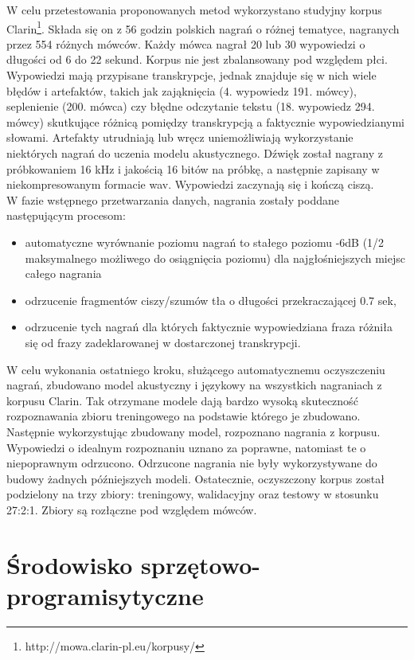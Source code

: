 \documentclass[shortabstract, mgr]{iithesis}
\begin{document}
	W celu przetestowania proponowanych metod wykorzystano studyjny korpus Clarin\footnote{http://mowa.clarin-pl.eu/korpusy/}. Składa się on z 56 godzin polskich nagrań o różnej tematyce, nagranych przez 554 różnych mówców. Każdy mówca nagrał 20 lub 30 wypowiedzi o długości od 6 do 22 sekund. Korpus nie jest zbalansowany pod względem płci. Wypowiedzi mają przypisane transkrypcje, jednak znajduje się w nich wiele błędów i artefaktów, takich jak zająknięcia (4. wypowiedz 191. mówcy), seplenienie (200. mówca) czy błędne odczytanie tekstu (18. wypowiedz 294. mówcy) skutkujące różnicą pomiędzy transkrypcją a faktycznie wypowiedzianymi słowami. Artefakty utrudniają lub wręcz uniemożliwiają wykorzystanie niektórych nagrań do uczenia modelu akustycznego. Dźwięk został nagrany z próbkowaniem 16 kHz i jakością 16 bitów na próbkę, a następnie zapisany w niekompresowanym formacie wav. Wypowiedzi zaczynają się i kończą ciszą. 
	\\
	W fazie wstępnego przetwarzania danych, nagrania zostały poddane następującym procesom:
	\begin{itemize}
		\item automatyczne wyrównanie poziomu nagrań to stałego poziomu -6dB (1/2 maksymalnego możliwego do osiągnięcia poziomu) dla najgłośniejszych miejsc całego nagrania
		\item odrzucenie fragmentów ciszy/szumów tła o długości przekraczającej 0.7 sek,
		\item odrzucenie tych nagrań dla których faktycznie wypowiedziana fraza różniła się od frazy zadeklarowanej w dostarczonej transkrypcji.
	\end{itemize}
	W celu wykonania ostatniego kroku, służącego automatycznemu oczyszczeniu nagrań, zbudowano model akustyczny i językowy na wszystkich nagraniach z korpusu Clarin. Tak otrzymane modele dają bardzo wysoką skuteczność rozpoznawania zbioru treningowego na podstawie którego je zbudowano. Następnie wykorzystując zbudowany model, rozpoznano nagrania z korpusu. Wypowiedzi o idealnym rozpoznaniu uznano za poprawne, natomiast te o niepoprawnym odrzucono. Odrzucone nagrania nie były wykorzystywane do budowy żadnych późniejszych modeli. 
	Ostatecznie, oczyszczony korpus został podzielony na trzy zbiory: treningowy, walidacyjny oraz testowy w stosunku 27:2:1. Zbiory są rozłączne pod względem mówców. 
	
	\section{Środowisko sprzętowo-programisytyczne }
	\label{sec:env}
	
\end{document}
